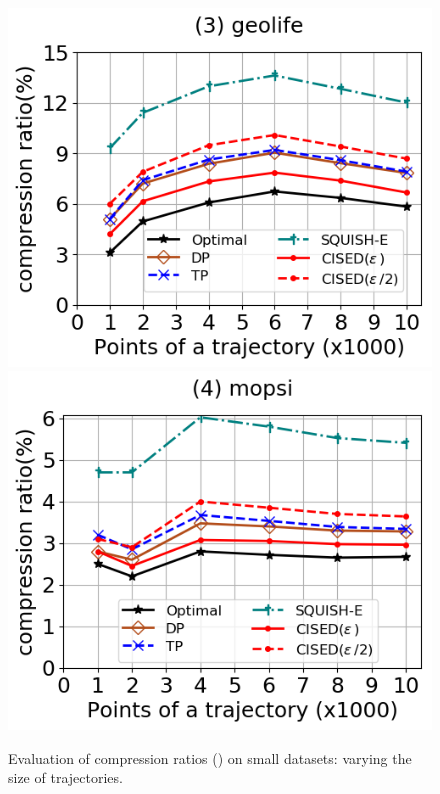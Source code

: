 \begin{figure}[tb!]
	\includegraphics[scale=0.315]{Figures/Exp-SED-CR-size-geolife.png}	\hspace{1ex}
	\includegraphics[scale=0.315]{Figures/Exp-SED-CR-size-mopsi.png}		
	\vspace{-3ex}

	\caption{\small Evaluation of compression ratios (\sed) on small datasets: varying the size of
    trajectories.}
  \label{fig:cr-sed-size}
	\vspace{-2ex}
\end{figure}

